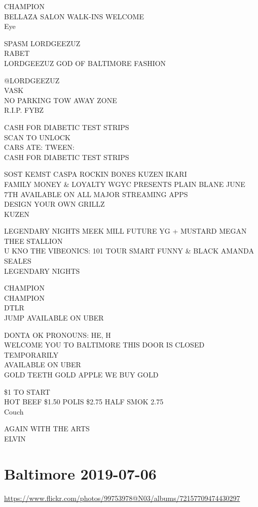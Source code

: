\documentclass[10pt,letterpaper]{article}
\begin{document}
CHAMPION\\
BELLAZA SALON WALK{-}INS WELCOME\\
Eye

SPASM LORDGEEZUZ\\
RABET\\
LORDGEEZUZ GOD OF BALTIMORE FASHION

@LORDGEEZUZ\\
VASK\\
NO PARKING TOW AWAY ZONE\\
R.I.P. FYBZ

CASH FOR DIABETIC TEST STRIPS\\
SCAN TO UNLOCK\\
CARS ATE: TWEEN:\\
CASH FOR DIABETIC TEST STRIPS

SOST KEMST CASPA ROCKIN BONES KUZEN IKARI\\
FAMILY MONEY \& LOYALTY WGYC PRESENTS PLAIN BLANE JUNE 7TH AVAILABLE ON ALL MAJOR STREAMING APPS\\
DESIGN YOUR OWN GRILLZ\\
KUZEN

LEGENDARY NIGHTS MEEK MILL FUTURE YG + MUSTARD MEGAN THEE STALLION\\
U KNO THE VIBEONICS: 101 TOUR SMART FUNNY \& BLACK AMANDA SEALES\\
LEGENDARY NIGHTS

CHAMPION\\
CHAMPION\\
DTLR\\
JUMP AVAILABLE ON UBER

DONTA OK PRONOUNS: HE, H\\
WELCOME YOU TO BALTIMORE THIS DOOR IS CLOSED TEMPORARILY\\
AVAILABLE ON UBER\\
GOLD TEETH GOLD APPLE WE BUY GOLD

\$1 TO START\\
HOT BEEF \$1.50 POLIS \$2.75 HALF SMOK 2.75\\
Couch

AGAIN WITH THE ARTS\\
ELVIN
\pagebreak

\section*{Baltimore 2019-07-06}

\url{https://www.flickr.com/photos/99753978@N03/albums/72157709474430297}
\end{document}

